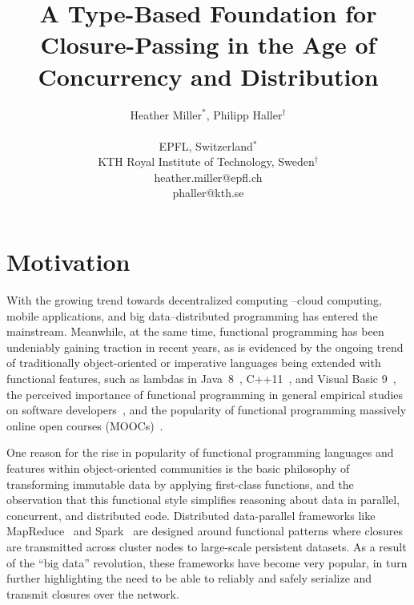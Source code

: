 \documentclass[english]{lni}
\author{
	Heather Miller$^*$, Philipp Haller$^\dagger$ \\
	\\
	EPFL, Switzerland$^*$ \\
	KTH Royal Institute of Technology, Sweden$^\dagger$ \\
	heather.miller@epfl.ch \\
	phaller@kth.se
}
\title{A Type-Based Foundation for Closure-Passing in the Age of Concurrency and Distribution}
\begin{document}
\maketitle


\vspace{-10mm}
\section{Motivation}
\vspace{-4mm}
With the growing trend towards decentralized computing --cloud computing,
mobile applications, and big data--distributed programming has entered the
mainstream. Meanwhile, at the same time, functional programming has been
undeniably gaining traction in recent years, as is evidenced by the ongoing
trend of traditionally object-oriented or imperative languages being extended
with functional features, such as lambdas in \mbox{Java 8}~\cite{JavaLambdas},
C++11~\cite{CplusplusLambas}, and Visual Basic 9~\cite{Meijer}, the perceived
importance of functional programming in general empirical studies on software
developers~\cite{PLAdoption}, and the popularity of functional programming
massively online open courses (MOOCs)~\cite{ICSEMOOC}.

One reason for the rise in popularity of functional programming languages and
features within object-oriented communities is the basic philosophy of
transforming immutable data by applying first-class functions, and the
observation that this functional style simplifies reasoning about data in
parallel, concurrent, and distributed code. Distributed data-parallel
frameworks like MapReduce~\cite{MapReduce} and Spark~\cite{Spark} are designed
around functional patterns where closures are transmitted across cluster nodes
to large-scale persistent datasets. As a result of the ``big data''
revolution, these frameworks have become very popular, in turn further
highlighting the need to be able to reliably and safely serialize and transmit
closures over the network.
\end{document}
